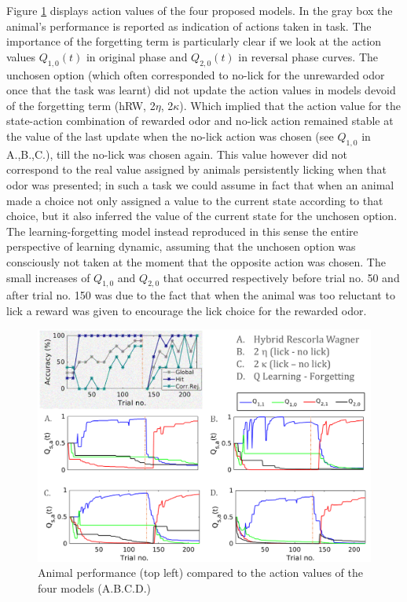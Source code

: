 Figure \ref{fig:4models} displays action values of the four proposed models. In the gray box the animal's performance is reported as indication of actions taken in task. The importance of the forgetting term is particularly clear if we look at the action values $Q_{1,0}(t)$ in original phase and $Q_{2,0}(t)$ in reversal phase curves. The unchosen option (which often corresponded to no-lick for the unrewarded odor once that the task was learnt) did not update the action values in models devoid of the forgetting term (hRW, 2$\eta$, 2$\kappa$). Which implied that the action value for the state-action combination of rewarded odor and no-lick action remained stable at the value of the last update when the no-lick action was chosen (see $Q_{1,0}$ in A.,B.,C.), till the no-lick was chosen again. This value however did not correspond to the real value assigned by animals persistently licking when that odor was presented; in such a task we could assume in fact that when an animal made a choice not only assigned a value to the current state according to that choice, but it also inferred the value of the current state for the unchosen option. The learning-forgetting model instead reproduced in this sense the entire perspective of learning dynamic, assuming that the unchosen option was consciously not taken at the moment that the opposite action was chosen. The small increases of $Q_{1,0}$ and $Q_{2,0}$ that occurred respectively before trial no. 50 and after trial no. 150 was due to the fact that when the animal was too reluctant to lick a reward was given to encourage the lick choice for the rewarded odor. 
\begin{figure}
    \centering
    \includegraphics[scale=0.7]{figures/Resume4models3.png}
    \caption{Animal performance (top left) compared to the action values of the four models (A.B.C.D.)}
    \label{fig:4models}
\end{figure}

